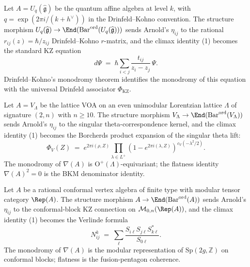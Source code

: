 \begin{corollary}
\label{cor:climax-drinfeld-kohno}
\ClaimStatusProvedHere
Let $A = U_q(\widehat{\mathfrak{g}})$ be the quantum affine algebra at level
$k$, with $q = \exp(2 \pi i / (k + h^\vee))$ in the Drinfeld--Kohno
convention. The structure morphism
$U_q(\widehat{\mathfrak{g}}) \to \End(\mathrm{Bar}^{\mathrm{ord}}(U_q(\widehat{\mathfrak{g}})))$
sends Arnold's $\eta_{ij}$ to the rational
$r_{ij}(z) = \hbar / z_{ij}$ Drinfeld--Kohno $r$-matrix, and the climax
identity (1) becomes the standard KZ equation
\[
 d \Psi \;=\; \hbar \sum_{i < j} \frac{t_{ij}}{z_i - z_j}\, \Psi.
\]
Drinfeld--Kohno's monodromy theorem identifies the monodromy of this
equation with the universal Drinfeld associator $\Phi_{\mathrm{KZ}}$.
\end{corollary}

\begin{corollary}
\label{cor:climax-borcherds}
\ClaimStatusProvedHere
Let $A = V_\Lambda$ be the lattice VOA on an even unimodular Lorentzian
lattice $\Lambda$ of signature $(2, n)$ with $n \geq 10$. The structure
morphism $V_\Lambda \to \End(\mathrm{Bar}^{\mathrm{ord}}(V_\Lambda))$
sends Arnold's $\eta_{ij}$ to the singular theta-correspondence kernel,
and the climax identity (1) becomes the Borcherds product expansion of
the singular theta lift:
\[
 \Phi_V(Z) \;=\; e^{2 \pi i (\rho, Z)} \prod_{\lambda \in L^+} (1 - e^{2 \pi i (\lambda, Z)})^{c_V(-\lambda^2/2)}.
\]
The monodromy of $\nabla(A)$ is $\mathrm{O}^+(\Lambda)$-equivariant; the
flatness identity $\nabla(A)^2 = 0$ is the BKM denominator identity.
\end{corollary}

\begin{corollary}
\label{cor:climax-verlinde}
\ClaimStatusProvedHere
Let $A$ be a rational conformal vertex algebra of finite type with
modular tensor category $\Rep(A)$. The structure morphism
$A \to \End(\mathrm{Bar}^{\mathrm{ord}}(A))$ sends Arnold's $\eta_{ij}$
to the conformal-block KZ connection on
$\mathcal{M}_{0, n}(\Rep(A))$, and the climax identity (1) becomes the
Verlinde formula
\[
 N_{ij}^k \;=\; \sum_{\ell} \frac{S_{i\ell} S_{j\ell} S_{k\ell}^*}{S_{0\ell}}.
\]
The monodromy of $\nabla(A)$ is the modular representation of
$\mathrm{Sp}(2 g, \mathbb{Z})$ on conformal blocks; flatness is the
fusion-pentagon coherence.
\end{corollary}

